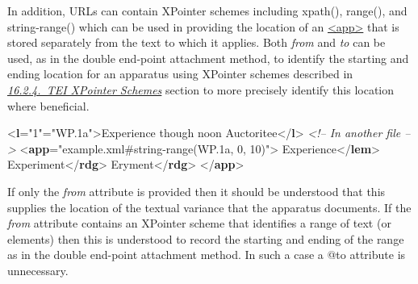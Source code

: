 In addition, URLs can contain XPointer schemes including xpath(), range(), and string-range() which can be used in providing the location of an \hyperref[TEI.app]{<app>} that is stored separately from the text to which it applies. Both {\itshape from} and {\itshape to} can be used, as in the double end-point attachment method, to identify the starting and ending location for an apparatus using XPointer schemes described in \textit{\hyperref[SATS]{16.2.4.\ TEI XPointer Schemes}} section to more precisely identify this location where beneficial. \par\bgroup{}\exampleFont \begin{shaded}\noindent\mbox{}{<\textbf{l}\hspace*{1em}{n}="{1}"\hspace*{1em}{xml:id}="{WP.1a}">}Experience though noon Auctoritee{</\textbf{l}>}\mbox{}\newline 
\textit{<!-- In another file -->}\mbox{}\newline 
{<\textbf{app}\hspace*{1em}{from}="{example.xml\#string-range(WP.1a, 0, 10)}">}\mbox{}\newline 
{}Experience{</\textbf{lem}>}\mbox{}\newline 
{}Experiment{</\textbf{rdg}>}\mbox{}\newline 
{}Eryment{</\textbf{rdg}>}\mbox{}\newline 
{</\textbf{app}>}\end{shaded}\egroup\par \par
If only the {\itshape from} attribute is provided then it should be understood that this supplies the location of the textual variance that the apparatus documents. If the {\itshape from} attribute contains an XPointer scheme that identifies a range of text (or elements) then this is understood to record the starting and ending of the range as in the double end-point attachment method. In such a case a @to attribute is unnecessary.
